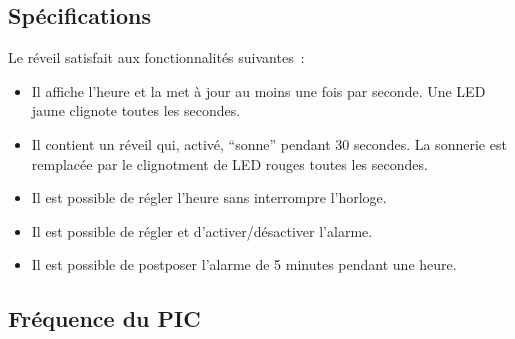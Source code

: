 \documentclass[12pt,a4paper]{article}
\begin{document}
    \subsection{Spécifications}
    Le réveil satisfait aux fonctionnalités suivantes~:
    \begin{itemize}
    \item Il affiche l'heure et la met à jour au moins une fois par seconde. Une LED jaune clignote toutes les secondes.
    \item Il contient un réveil qui, activé, ``sonne'' pendant 30 secondes. La sonnerie est remplacée par le clignotment de LED rouges toutes les secondes.
    \item Il est possible de régler l'heure sans interrompre l'horloge.
    \item Il est possible de régler et d'activer/désactiver l'alarme.
    \item Il est possible de postposer l'alarme de 5 minutes pendant une heure.
    \end{itemize}
    
 
 

    
    \subsection{Fréquence du PIC}
    \label{subsec:freq}
    
\end{document}
